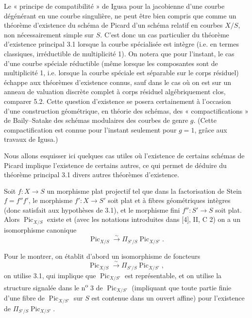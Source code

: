  Le « principe de compatibilité » de Igusa pour la
jacobienne d'une courbe dégénérant en une courbe singulière, ne peut être bien
compris que comme un théorème d'existence du schéma de Picard d'un schéma
relatif en courbes $X/S$, non nécessairement simple sur $S$. C'est donc un cas
particulier du théorème d'existence principal 3.1 lorsque la courbe spécialisée
est intègre (i.e. en termes classiques, irréductible de multiplicité 1). On
notera que pour l'instant, le cas d'une courbe spéciale réductible (même
lorsque les composantes sont de multiplicité 1, i.e. lorsque la courbe spéciale
est séparable sur le corps résiduel) échappe aux théorèmes d'existence connus,
sauf dans le cas où on est sur un anneau de valuation discrète complet à corps
résiduel algébriquement clos, comparer 5.2. Cette question d'existence se posera
certainement à l'occasion d'une construction géométrique, en théorie des
schémas, des « compactifications » de Baily--Satake des schémas modulaires des
courbes de genre $g$. (Cette compactification est connue pour l'instant
seulement pour $g=1$, grâce aux travaux de Igusa.)


Nous allons esquisser ici quelques cas utiles où l'existence de certains
schémas de Picard implique l'existence de certains autres, ce qui permet de
déduire du théorème principal 3.1 divers autres théorèmes d'existence.

 Soit $f:X\longrightarrow S$ un morphisme plat
projectif tel que dans la factorisation de Stein $f=f''f'$, le morphisme
$f':X\longrightarrow S'$ soit plat et à fibres géométriques intègres (donc
satisfait aux hypothèses de 3.1), et le morphisme fini
$f'':S'\longrightarrow S$ soit plat. Alors $\operatorname{Pic}_{X/S}$ existe et
(avec les notations introduites dans [4], II, C 2) on a un isomorphisme
canonique
\[
\operatorname{Pic}_{X/S}\xrightarrow{\sim}
\Pi_{S'/S}\operatorname{Pic}_{X/S'}.
\]

Pour le montrer, on établit d'abord un isomorphisme de foncteurs
\[
\operatorname{Pic}_{X/S}\xrightarrow{\sim}
\Pi_{S'/S}\operatorname{Pic}_{X/S'},
\]
on utilise 3.1, qui implique que $\operatorname{Pic}_{X/S'}$ est représentable,
et on utilise la structure signalée dans le n\textsuperscript{o} 3 de
$\operatorname{Pic}_{X/S'}$ (impliquant que toute partie finie d'une fibre de
$\operatorname{Pic}_{X/S'}$ sur $S$ est contenue dans un ouvert affine) pour
l'existence de $\Pi_{S'/S}\operatorname{Pic}_{X/S'}$.

